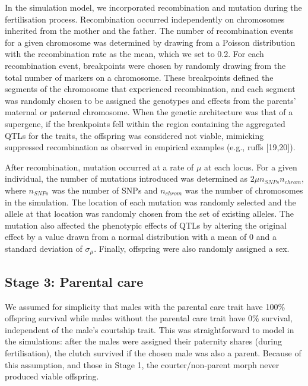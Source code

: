 \documentclass[
  11pt,
  a4paper,
]{article}
\begin{document}
In the simulation model, we incorporated recombination and mutation
during the fertilisation process. Recombination occurred independently
on chromosomes inherited from the mother and the father. The number of
recombination events for a given chromosome was determined by drawing
from a Poisson distribution with the recombination rate as the mean,
which we set to 0.2. For each recombination event, breakpoints were
chosen by randomly drawing from the total number of markers on a
chromosome. These breakpoints defined the segments of the chromosome
that experienced recombination, and each segment was randomly chosen to
be assigned the genotypes and effects from the parents' maternal or
paternal chromosome. When the genetic architecture was that of a
supergene, if the breakpoints fell within the region containing the
aggregated QTLs for the traits, the offspring was considered not viable,
mimicking suppressed recombination as observed in empirical examples
(e.g., ruffs {[}19,20{]}).

After recombination, mutation occurred at a rate of \(\mu\) at each locus.
For a given individual, the number of mutations introduced was
determined as \(2\mu n_{SNPs} n_{chrom}\), where \(n_{SNPs}\) was the number
of SNPs and \(n_{chrom}\) was the number of chromosomes in the simulation.
The location of each mutation was randomly selected and the allele at
that location was randomly chosen from the set of existing alleles. The
mutation also affected the phenotypic effects of QTLs by altering the
original effect by a value drawn from a normal distribution with a mean
of 0 and a standard deviation of \(\sigma_\mu\). Finally, offspring were
also randomly assigned a sex.

\hypertarget{stage-3-parental-care}{%
\subsection{Stage 3: Parental care}\label{stage-3-parental-care}}

We assumed for simplicity that males with the parental care trait have
100\% offspring survival while males without the parental care trait have
0\% survival, independent of the male's courtship trait. This was
straightforward to model in the simulations: after the males were
assigned their paternity shares (during fertilisation), the clutch
survived if the chosen male was also a parent. Because of this
assumption, and those in Stage 1, the courter/non-parent morph never
produced viable offspring.
\end{document}
